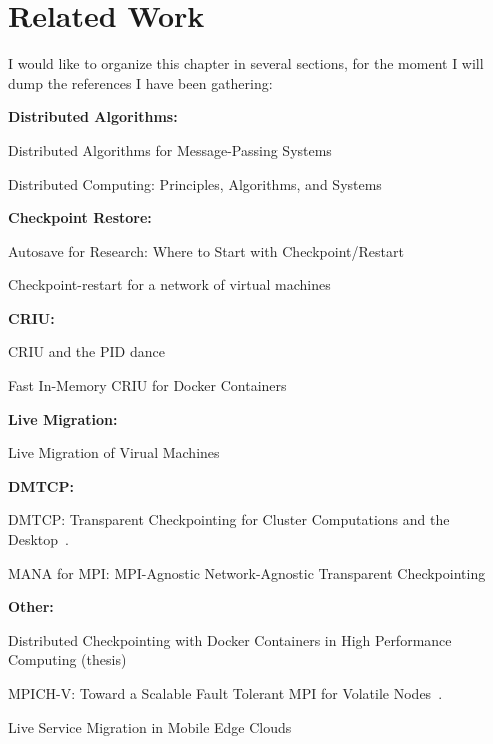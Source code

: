 \chapter{Related Work} \label{chap:related-work}

I would like to organize this chapter in several sections, for the moment I will dump the references I have been gathering:

\textbf{Distributed Algorithms:}

Distributed Algorithms for Message-Passing Systems~\cite{Raynal2013}

Distributed Computing: Principles, Algorithms, and Systems~\cite{Kshemkalyani2008}

\textbf{Checkpoint Restore:}

Autosave for Research: Where to Start with Checkpoint/Restart~\cite{Barker2014}

Checkpoint-restart for a network of virtual machines~\cite{Garg2013}

\textbf{CRIU:}

CRIU and the PID dance~\cite{Reber2019}

Fast In-Memory CRIU for Docker Containers~\cite{Venkatesh2019}

\textbf{Live Migration:}

Live Migration of Virual Machines~\cite{Clark2005}

\textbf{DMTCP:}

DMTCP: Transparent Checkpointing for Cluster Computations and the Desktop~\cite{Ansel2009}.

MANA for MPI: MPI-Agnostic Network-Agnostic Transparent Checkpointing~\cite{Garg2019}

\textbf{Other:}

Distributed Checkpointing with Docker Containers in High Performance Computing (thesis)~\cite{Berg2017}

MPICH-V: Toward a Scalable Fault Tolerant MPI for Volatile Nodes~\cite{Bosilca2002}.

Live Service Migration in Mobile Edge Clouds~\cite{Machen2018}
